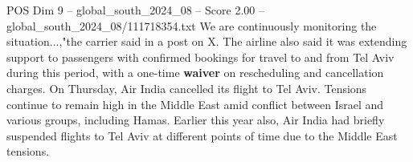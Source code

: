 \begin{textsample}{POS Dim 9 – global\_south\_2024\_08 – Score 2.00 – global\_south\_2024\_08/111718354.txt}
We are continuously monitoring the situation...,"the carrier said in a post on X.
The airline also said it was extending support to passengers with confirmed bookings for travel to and from Tel Aviv during this period, with a one-time \textbf{waiver} on rescheduling and cancellation charges.
On Thursday, Air India cancelled its flight to Tel Aviv.
Tensions continue to remain high in the Middle East amid conflict between Israel and various groups, including Hamas.
Earlier this year also, Air India had briefly suspended flights to Tel Aviv at different points of time due to the Middle East tensions.

\end{textsample}
